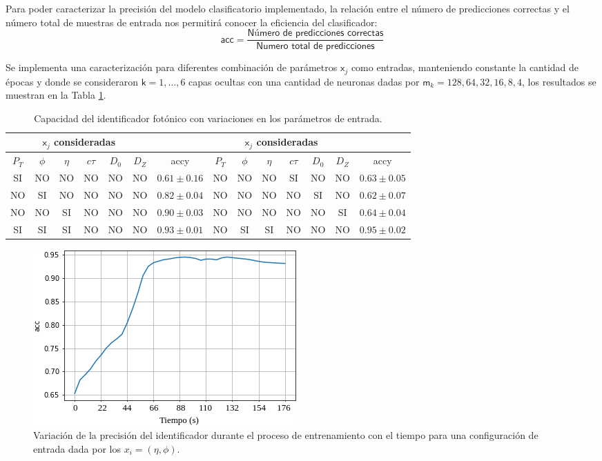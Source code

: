 Para poder caracterizar la precisión del modelo clasificatorio implementado, la relación entre el número de predicciones correctas y el número total de muestras de entrada nos permitirá conocer la eficiencia del clasificador:
\begin{equation}\label{acc}
\textsf{acc} =  \dfrac{\textsf{Número de predicciones correctas}}{\textsf{Numero total de predicciones}}
\end{equation}

Se implementa una caracterización para diferentes combinación de parámetros $\textsf{x}_{j}$ como entradas, manteniendo constante la cantidad de épocas y donde se consideraron $\textsf{k}=1,\ldots,6$ capas ocultas con una cantidad de neuronas dadas por $\textsf{m}_k = 128, 64, 32, 16, 8, 4$, los resultados se muestran en la Tabla \ref{ajuste1}.

\begin{table}[!h]
\footnotesize
\centering
\begin{tabular}{|cccccc|c||cccccc|c|}
\toprule
\multicolumn{6}{|c|}{$\textsf{x}_j$ consideradas} &  &
\multicolumn{6}{|c|}{$\textsf{x}_j$ consideradas} &  \\
\midrule
$P_T$ & $\phi$ & $\eta$ & $c\tau$ & $D_0$ & $D_Z$  & \textsf{accy} &
$P_T$ & $\phi$ & $\eta$ & $c\tau$ & $D_0$ & $D_Z$  & \textsf{accy} \\
\midrule
SI & NO & NO & NO & NO & NO & $0.61 \pm 0.16$ & 
NO & NO & NO & SI & NO & NO & $0.63 \pm 0.05$\\
NO & SI & NO & NO & NO & NO & $0.82 \pm 0.04$ & 
NO & NO & NO & NO & SI & NO & $0.62 \pm 0.07$\\  
NO & NO & SI & NO & NO & NO & $0.90 \pm 0.03$ & 
NO & NO & NO & NO & NO & SI & $0.64 \pm 0.04$\\
\bottomrule
SI & SI & SI & NO & NO & NO & $0.93 \pm 0.01$ &
NO & SI & SI & NO & NO & NO & $0.95 \pm 0.02$\\
\bottomrule 
\end{tabular}%
\caption{Capacidad del identificador fotónico con variaciones en los parámetros de entrada.}
\label{ajuste1}
\end{table}

\begin{figure}[!h]
\centering
\includegraphics[width=.5\textwidth]{Cap4/imagenes/acc.png}
\caption{Variación de la precisión del identificador durante el proceso de entrenamiento con el tiempo para una configuración de entrada dada por los $x_i = (\eta, \phi)$.}
\label{identificador0}
\end{figure}

